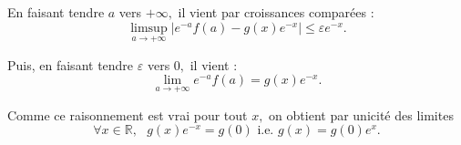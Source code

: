En faisant tendre $a$ vers $+\infty,$ il vient par croissances comparées :  $$\limsup_{a\rightarrow +\infty}\vert e^{-a}f(a)-g(x)e^{-x}\vert\leq \varepsilon e^{-x}.$$

Puis, en faisant tendre $\varepsilon$ vers $0,$ il vient : $$\lim_{a\rightarrow +\infty} e^{-a}f(a)=g(x)e^{-x}.$$

Comme ce raisonnement est vrai pour tout $x,$ on obtient par unicité des limites $$\forall x\in \mathbb{R},\mbox{ } g(x)e^{-x}=g(0) \mbox{ i.e. } g(x)=g(0)e^{x}.$$














